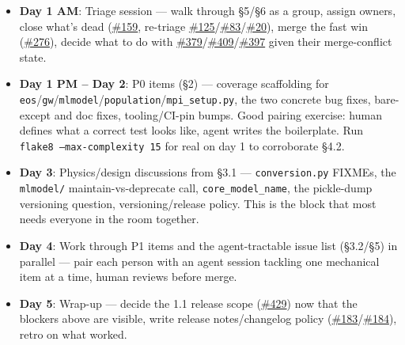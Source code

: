 \documentclass[10pt]{article}
\newcommand{\code}[1]{\texttt{#1}}
\begin{document}
\begin{itemize}
\item \textbf{Day 1 AM}: Triage session --- walk through \S5/\S6 as a group, assign
  owners, close what's dead (\href{https://github.com/nuclear-multimessenger-astronomy/nmma/issues/159}{\#159}, re-triage \href{https://github.com/nuclear-multimessenger-astronomy/nmma/issues/125}{\#125}/\href{https://github.com/nuclear-multimessenger-astronomy/nmma/issues/83}{\#83}/\href{https://github.com/nuclear-multimessenger-astronomy/nmma/issues/20}{\#20}), merge the fast win
  (\href{https://github.com/nuclear-multimessenger-astronomy/nmma/issues/276}{\#276}), decide what to do with \href{https://github.com/nuclear-multimessenger-astronomy/nmma/issues/379}{\#379}/\href{https://github.com/nuclear-multimessenger-astronomy/nmma/issues/409}{\#409}/\href{https://github.com/nuclear-multimessenger-astronomy/nmma/issues/397}{\#397} given their merge-conflict state.
\item \textbf{Day 1 PM -- Day 2}: P0 items (\S2) --- coverage scaffolding for
  \code{eos}/\code{gw}/\code{mlmodel}/\code{population}/\code{mpi\_setup.py}, the
  two concrete bug fixes, bare-except and doc fixes, tooling/CI-pin bumps. Good
  pairing exercise: human defines what a correct test looks like, agent writes the
  boilerplate. Run \code{flake8 --max-complexity 15} for real on day 1 to
  corroborate \S4.2.
\item \textbf{Day 3}: Physics/design discussions from \S3.1 ---
  \code{conversion.py} FIXMEs, the \code{mlmodel/} maintain-vs-deprecate call,
  \code{core\_model\_name}, the pickle-dump versioning question, versioning/release
  policy. This is the block that most needs everyone in the room together.
\item \textbf{Day 4}: Work through P1 items and the agent-tractable issue list
  (\S3.2/\S5) in parallel --- pair each person with an agent session tackling one
  mechanical item at a time, human reviews before merge.
\item \textbf{Day 5}: Wrap-up --- decide the 1.1 release scope (\href{https://github.com/nuclear-multimessenger-astronomy/nmma/issues/429}{\#429}) now that the
  blockers above are visible, write release notes/changelog policy (\href{https://github.com/nuclear-multimessenger-astronomy/nmma/issues/183}{\#183}/\href{https://github.com/nuclear-multimessenger-astronomy/nmma/issues/184}{\#184}),
  retro on what worked.
\end{itemize}
\end{document}
